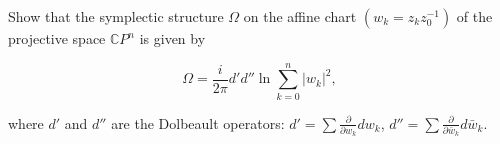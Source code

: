 Show that the symplectic structure $\Omega$ on the affine chart $(w_k = z_k z_0^{-1})$ of the projective space $\mathbb{C}P^n$ is given by

$$\Omega = \frac{i}{2\pi} d' d'' \ln \sum_{k=0}^{n} |w_k|^2,$$

where $d'$ and $d''$ are the Dolbeault operators: $d' = \sum \frac{\partial}{\partial w_k} dw_k$, $d'' = \sum \frac{\partial}{\partial \bar{w}_k} d\bar{w}_k$.
